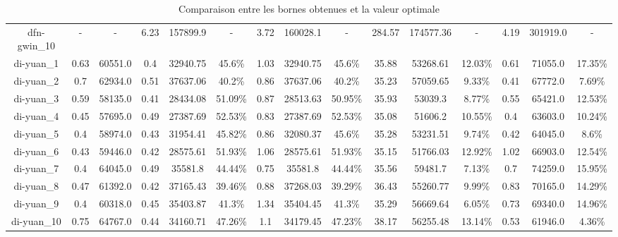 \documentclass[main.tex]{subfiles}
\begin{document}
\begin{landscape}
\begin{table}[h]
{\begin{tabular}{c|cc|ccc|ccc|ccc|ccc}
	dfn-gwin\_10 &- &- &6.23 &157899.9 &- &3.72 &160028.1 &- &284.57 &174577.36 &- &4.19 &301919.0 &-\\
	di-yuan\_1 &0.63 &60551.0 &0.4 &32940.75 &45.6\% &1.03 &32940.75 &45.6\% &35.88 &53268.61 &12.03\% &0.61 &71055.0 &17.35\%\\
	di-yuan\_2 &0.7 &62934.0 &0.51 &37637.06 &40.2\% &0.86 &37637.06 &40.2\% &35.23 &57059.65 &9.33\% &0.41 &67772.0 &7.69\%\\
	di-yuan\_3 &0.59 &58135.0 &0.41 &28434.08 &51.09\% &0.87 &28513.63 &50.95\% &35.93 &53039.3 &8.77\% &0.55 &65421.0 &12.53\%\\
	di-yuan\_4 &0.45 &57695.0 &0.49 &27387.69 &52.53\% &0.83 &27387.69 &52.53\% &35.08 &51606.2 &10.55\% &0.4 &63603.0 &10.24\%\\
	di-yuan\_5 &0.4 &58974.0 &0.43 &31954.41 &45.82\% &0.86 &32080.37 &45.6\% &35.28 &53231.51 &9.74\% &0.42 &64045.0 &8.6\%\\
	di-yuan\_6 &0.43 &59446.0 &0.42 &28575.61 &51.93\% &1.06 &28575.61 &51.93\% &35.15 &51766.03 &12.92\% &1.02 &66903.0 &12.54\%\\
	di-yuan\_7 &0.4 &64045.0 &0.49 &35581.8 &44.44\% &0.75 &35581.8 &44.44\% &35.56 &59481.7 &7.13\% &0.7 &74259.0 &15.95\%\\
	di-yuan\_8 &0.47 &61392.0 &0.42 &37165.43 &39.46\% &0.88 &37268.03 &39.29\% &36.43 &55260.77 &9.99\% &0.83 &70165.0 &14.29\%\\
	di-yuan\_9 &0.4 &60318.0 &0.45 &35403.87 &41.3\% &1.34 &35404.45 &41.3\% &35.29 &56669.64 &6.05\% &0.73 &69340.0 &14.96\%\\
	di-yuan\_10 &0.75 &64767.0 &0.44 &34160.71 &47.26\% &1.1 &34179.45 &47.23\% &38.17 &56255.48 &13.14\% &0.53 &61946.0 &4.36\%\\
    \end{tabular}
}
\caption{Comparaison entre les bornes obtenues et la valeur optimale}
\end{table}
\end{landscape}
\newpage
\thispagestyle{empty}
\end{document}
